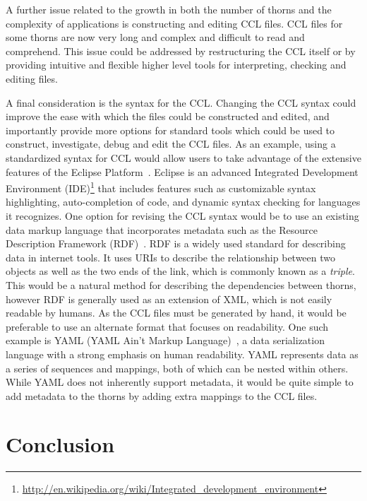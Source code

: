 \documentclass[conference]{IEEEtran}
\begin{document}
A further issue related to the growth in both the number of thorns and the complexity of applications is constructing and editing CCL files. CCL files for some thorns are now very long and complex and difficult to read and comprehend. This issue could be addressed by restructuring the CCL itself or by providing intuitive and  flexible higher level tools for interpreting, checking and editing files.



A final consideration is the syntax for the CCL. Changing the CCL syntax could improve the 
ease with which the files could be constructed and edited, and importantly provide 
more options for standard tools which could be used to construct, investigate, debug and edit 
the CCL files. As an example, using a standardized syntax for CCL would allow users to take
advantage of the extensive features of the Eclipse Platform~\cite{eclipseweb}. Eclipse is an 
advanced Integrated Development Environment (IDE)\footnote{\url{http://en.wikipedia.org/wiki/Integrated_development_environment}}
 that includes features such as customizable syntax highlighting, auto-completion of code,
and dynamic syntax checking for languages it recognizes.
One option for revising the CCL syntax would be to use an existing data markup language that
incorporates metadata such as the Resource Description Framework (RDF)~\cite{rdfweb}. RDF is a 
widely used standard for describing data in internet tools. It uses URIs to describe the relationship
between two objects as well as the two ends of the link, which is commonly known as a \emph{triple}.
This would be a natural method for describing the dependencies between thorns, however RDF is
generally used as an extension of XML, which is not easily readable by humans. As the CCL files
must be generated by hand, it would be preferable to use an alternate format that focuses on
readability. One such example is YAML (YAML Ain't Markup Language)~\cite{yamlweb}, a data
serialization language with a strong emphasis on human readability. YAML represents data as a
series of sequences and mappings, both of which can be nested within others. While YAML does 
not inherently support metadata, it would be quite simple to add metadata to the thorns by adding
 extra mappings to the CCL files.










\section{Conclusion}
\end{document}
